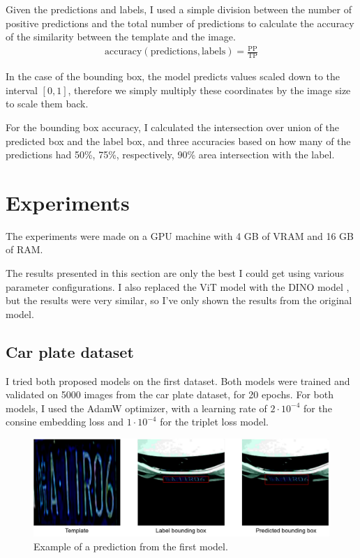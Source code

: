 \documentclass{report}[12pt, a4paper]
\begin{document}
Given the predictions and labels, I used a simple division between the number of positive predictions and the total number of predictions to calculate the accuracy of the similarity between the template and the image.
\begin{align*}
    \text{accuracy}\left(\text{predictions}, \text{labels}\right) = \frac{\text{PP}}{\text{TP}}
\end{align*}

In the case of the bounding box, the model predicts values scaled down to the interval $\left[0,1\right]$, therefore we simply multiply these coordinates by the image size to scale them back.

For the bounding box accuracy, I calculated the intersection over union of the predicted box and the label box, and three accuracies based on how many of the predictions had 50\%, 75\%, respectively, 90\% area intersection with the label.

\section{Experiments}

The experiments were made on a GPU machine with 4 GB of VRAM and 16 GB of RAM.

The results presented in this section are only the best I could get using various parameter configurations. I also replaced the ViT model with the DINO model \cite{dino_paper}, but the results were very similar, so I've only shown the results from the original model.


\subsection{Car plate dataset}

I tried both proposed models on the first dataset. Both models were trained and validated on 5000 images from the car plate dataset, for 20 epochs. For both models, I used the AdamW optimizer, with a learning rate of $2\cdot10^{-4}$ for the consine embedding loss and $1\cdot10^{-4}$ for the triplet loss model.
\begin{figure}[htp]
    \centering
    \includegraphics[width=14cm]{prediction_image_cosine_model}
    \caption{Example of a prediction from the first model.}
    \label{fig:prediction_image_cosine_model}
\end{figure}
\end{document}
